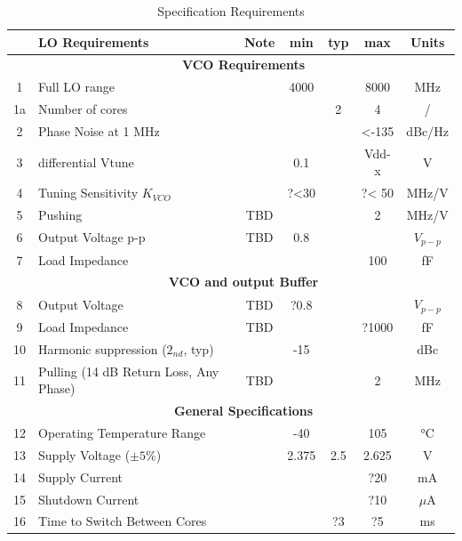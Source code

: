 \begin{table}[ht]
	\centering
	\begin{tabular}{|c|l|c|c|c|c|c|}
		\hline
		& LO Requirements & Note & min & typ & max & Units \\
		\hline
		& \multicolumn{6}{|c|}{\textbf{VCO Requirements}} \\
		\hline
		1 & Full LO range &  & 4000  &  & 8000 & MHz \\ 
		\hline
		1a & Number of cores &  &   & 2 & 4 & / \\ 
		\hline
		2 & Phase Noise at 1 MHz &  &  &  & <-135 & dBc/Hz \\ 
		\hline
		3 & differential Vtune &  & 0.1 &  & Vdd-x & V  \\ %
		\hline
		4 & Tuning Sensitivity $K_{VCO}$ &  & ?<30 &  & ?< 50 & MHz/V  \\ 
		\hline
		5 & Pushing & TBD &  &  & 2 & MHz/V  \\ 
		\hline
		6 & Output Voltage p-p & TBD & 0.8 &  & & $V_{p-p}$  \\ 
		\hline
		7 & Load Impedance &  &  &  & 100 & fF  \\ 
		\hline
		& \multicolumn{6}{|c|}{\textbf{VCO and output Buffer}} \\
		\hline
		8 & Output Voltage & TBD & ?0.8  &  &  & $V_{p-p}$ \\ 
		\hline
		9 & Load Impedance & TBD &  &  & ?1000 & fF  \\ 
		\hline
		10 & Harmonic suppression ($2_{nd}$, typ) &  & -15 &  &  & dBc  \\ 
		\hline
		11 & Pulling (14 dB Return Loss, Any Phase) & TBD &  &  & 2 & MHz  \\ 
		\hline
		& \multicolumn{6}{|c|}{\textbf{General Specifications}} \\
		\hline
		12 & Operating Temperature Range &  & -40 &  & 105 & °C  \\ 
		\hline
		13 & Supply Voltage ($\pm 5\%$) &  & 2.375 & 2.5 & 2.625 & V  \\ 
		\hline
		14 & Supply Current &  &  &  & ?20 & mA  \\ 
		\hline
		15 & Shutdown Current &  &  &  & ?10 & $\mu$A  \\ 
		\hline
		16 & Time to Switch Between Cores  &  &  & ?3 & ?5 & ms  \\ 
		\hline
	\end{tabular}
	\label{table-spec-ultra-low-noise}
	\caption{Specification Requirements} 

\end{table}

